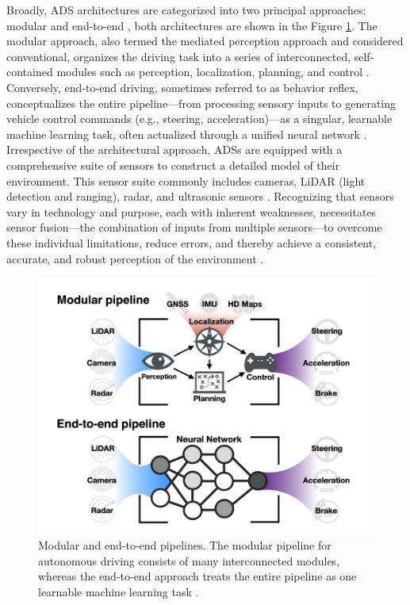 Broadly, ADS architectures are categorized into two principal approaches: modular and end-to-end \cite{tampuuSurveyEndtoEndDriving2022}, both architectures are shown in the Figure \ref{fig:figure_background_ads_system_architecture}. The modular approach, also termed the mediated perception approach and considered conventional, organizes the driving task into a series of interconnected, self-contained modules such as perception, localization, planning, and control \cite{tampuuSurveyEndtoEndDriving2022}. Conversely, end-to-end driving, sometimes referred to as behavior reflex, conceptualizes the entire pipeline—from processing sensory inputs to generating vehicle control commands (e.g., steering, acceleration)—as a singular, learnable machine learning task, often actualized through a unified neural network \cite{tampuuSurveyEndtoEndDriving2022}. Irrespective of the architectural approach, ADSs are equipped with a comprehensive suite of sensors to construct a detailed model of their environment. This sensor suite commonly includes cameras, LiDAR (light detection and ranging), radar, and ultrasonic sensors \cite{matosSurveySensorFailures2024}. Recognizing that sensors vary in technology and purpose, each with inherent weaknesses, necessitates sensor fusion—the combination of inputs from multiple sensors—to overcome these individual limitations, reduce errors, and thereby achieve a consistent, accurate, and robust perception of the environment \cite{matosSurveySensorFailures2024}.

\begin{figure}
    \centering
    \includegraphics[width=\textwidth]{figures/figure_background_ads_system_architecture.png}
    \caption{Modular and end-to-end pipelines. The modular pipeline for autonomous driving consists of many interconnected modules, whereas the end-to-end approach treats the entire pipeline as one learnable machine learning task \cite{tampuuSurveyEndtoEndDriving2022}.}
    \label{fig:figure_background_ads_system_architecture}
\end{figure}

